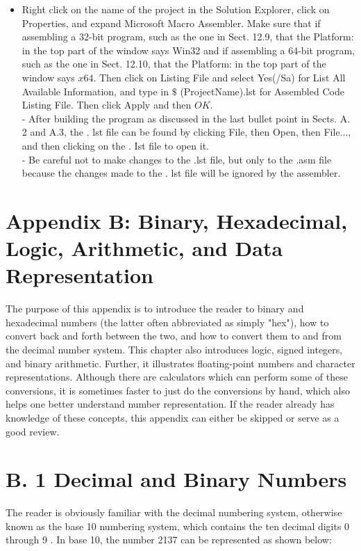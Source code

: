 \documentclass[10pt]{article}
\begin{document}
\begin{itemize}
  \item Right click on the name of the project in the Solution Explorer, click on Properties, and expand Microsoft Macro Assembler. Make sure that if assembling a 32-bit program, such as the one in Sect. 12.9, that the Platform: in the top part of the window says Win32 and if assembling a 64-bit program, such as the one in Sect. 12.10, that the Platform: in the top part of the window says $x 64$. Then click on Listing File and select Yes(/Sa) for List All Available Information, and type in $\$$ (ProjectName).lst for Assembled Code Listing File. Then click Apply and then $O K$.\\
- After building the program as discussed in the last bullet point in Sects. A. 2 and A.3, the . lst file can be found by clicking File, then Open, then File..., and then clicking on the . Ist file to open it.\\
- Be careful not to make changes to the .lst file, but only to the .asm file because the changes made to the . lst file will be ignored by the assembler.
\end{itemize}

\section*{Appendix B: Binary, Hexadecimal, Logic, Arithmetic, and Data Representation}
The purpose of this appendix is to introduce the reader to binary and hexadecimal numbers (the latter often abbreviated as simply "hex"), how to convert back and forth between the two, and how to convert them to and from the decimal number system. This chapter also introduces logic, signed integers, and binary arithmetic. Further, it illustrates floating-point numbers and character representations. Although there are calculators which can perform some of these conversions, it is sometimes faster to just do the conversions by hand, which also helps one better understand number representation. If the reader already has knowledge of these concepts, this appendix can either be skipped or serve as a good review.

\section*{B. 1 Decimal and Binary Numbers}
The reader is obviously familiar with the decimal numbering system, otherwise known as the base 10 numbering system, which contains the ten decimal digits 0 through 9 . In base 10, the number 2137 can be represented as shown below:
\end{document}
